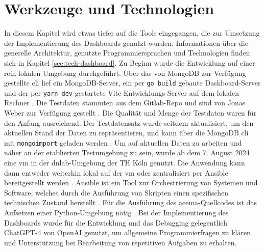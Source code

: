 \section{Werkzeuge und Technologien}
\label{sec:Entwicklungsumgebung}
In diesem Kapitel wird etwas tiefer auf die Tools eingegangen, die zur Umsetzung der Implementierung des Dashboards genutzt wurden. Informationen über die generelle Architektur, genutzte Programmiersprachen und Technologien finden sich in Kapitel \ref{sec:tech-dashboard}. Zu Beginn wurde die Entwicklung auf einer rein lokalen Umgebung durchgeführt. Über das von MongoDB zur Verfügung gestellte \gls{cli} lief ein MongoDB-Server, ein per \verb|go build| gebaute Dashboard-Server und der per \verb|yarn dev| gestartete Vite-Entwicklungs-Server auf dem lokalen Rechner \autocite{MongoDBDeveloperData,Vite}. Die Testdaten stammten aus dem Gitlab-Repo und sind von Jonas Weber zur Verfügung gestellt \autocite{AddExampleData2023}. Die Qualität und Menge der Testdaten waren für den Anfang ausreichend. Der Testdatensatz wurde seitdem aktualisiert, um den aktuellen Stand der Daten zu repräsentieren, und kann über die MongoDB \gls{cli} mit \verb|mongoimport| geladen werden \autocite{JSONMongoDB}. Um auf aktuellen Daten zu arbeiten und näher an der etablierten Testumgebung zu sein, wurde ab dem 7. August 2024 eine \gls{vm} in der \gls{dnlab}-Umgebung der TH Köln genutzt. Die Anwendung kann dann entweder weiterhin lokal auf der \gls{vm} oder zentralisiert per Ansible bereitgestellt werden \autocite{HomepageAnsibleCollaborative}. Ansible ist ein Tool zur Orchestrierung von Systemen und Software, welches durch die Ausführung von Skripten einen spezifischen technischen Zustand herstellt \autocite{ansiblecollaborativeetalHowAnsibleWorks2024}. Für die Ausführung des \gls{acema}-Quellcodes ist das Aufsetzen einer Python-Umgebung nötig \autocite{klement2023acema,WelcomePythonorg}.
Bei der Implementierung des Dashboards wurde für die Entwicklung und das Debugging gelegentlich ChatGPT-4 von OpenAI genutzt, um allgemeine Programmierfragen zu klären und Unterstützung bei Bearbeitung von repetitiven Aufgaben zu erhalten. 

